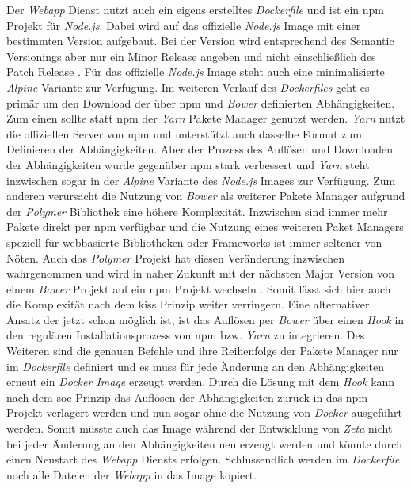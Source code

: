 Der \textit{Webapp} Dienst nutzt auch ein eigens erstelltes \textit{Dockerfile} und ist ein \ac{npm} Projekt für \textit{Node.js}. Dabei wird auf das offizielle \textit{Node.js} Image mit einer bestimmten Version aufgebaut. Bei der Version wird entsprechend des Semantic Versionings aber nur ein Minor Release angeben und nicht einschließlich des Patch Release \cite{semver}. Für das offizielle \textit{Node.js} Image steht auch eine minimalisierte \textit{Alpine} Variante zur Verfügung. Im weiteren Verlauf des \textit{Dockerfiles} geht es primär um den Download der über \ac{npm} und \textit{Bower} definierten Abhängigkeiten. Zum einen sollte statt \ac{npm} der \textit{Yarn} Pakete Manager genutzt werden. \textit{Yarn} nutzt die offiziellen Server von \ac{npm} und unterstützt auch dasselbe Format zum Definieren der Abhängigkeiten. Aber der Prozess des Auflösen und Downloaden der Abhängigkeiten wurde gegenüber \ac{npm} stark verbessert und \textit{Yarn} steht inzwischen sogar in der \textit{Alpine} Variante des \textit{Node.js} Images zur Verfügung. Zum anderen verursacht die Nutzung von \textit{Bower} als weiterer Pakete Manager aufgrund der \textit{Polymer} Bibliothek eine höhere Komplexität. Inzwischen sind immer mehr Pakete direkt per \ac{npm} verfügbar und die Nutzung eines weiteren Paket Managers speziell für webbasierte Bibliotheken oder Frameworks ist immer seltener von Nöten. Auch das \textit{Polymer} Projekt hat diesen Veränderung inzwischen wahrgenommen und wird in naher Zukunft mit der nächsten Major Version von einem \textit{Bower} Projekt auf ein \ac{npm} Projekt wechseln \cite{polymer3_preview}. Somit lässt sich hier auch die Komplexität nach dem \ac{kiss} Prinzip weiter verringern. Eine alternativer Ansatz der jetzt schon möglich ist, ist das Auflösen per \textit{Bower} über einen \textit{Hook} in den regulären Installationsprozess von \ac{npm} bzw. \textit{Yarn} zu integrieren. Des Weiteren sind die genauen Befehle und ihre Reihenfolge der Pakete Manager nur im \textit{Dockerfile} definiert und es muss für jede Änderung an den Abhängigkeiten erneut ein \textit{Docker Image} erzeugt werden. Durch die Lösung mit dem \textit{Hook} kann nach dem \ac{soc} Prinzip das Auflösen der Abhängigkeiten zurück in das \ac{npm} Projekt verlagert werden und nun sogar ohne die Nutzung von \textit{Docker} ausgeführt werden. Somit müsste auch das Image während der Entwicklung von \textit{Zeta} nicht bei jeder Änderung an den Abhängigkeiten neu erzeugt werden und könnte durch einen Neustart des \textit{Webapp} Diensts erfolgen. Schlussendlich werden im \textit{Dockerfile} noch alle Dateien der \textit{Webapp} in das Image kopiert.


